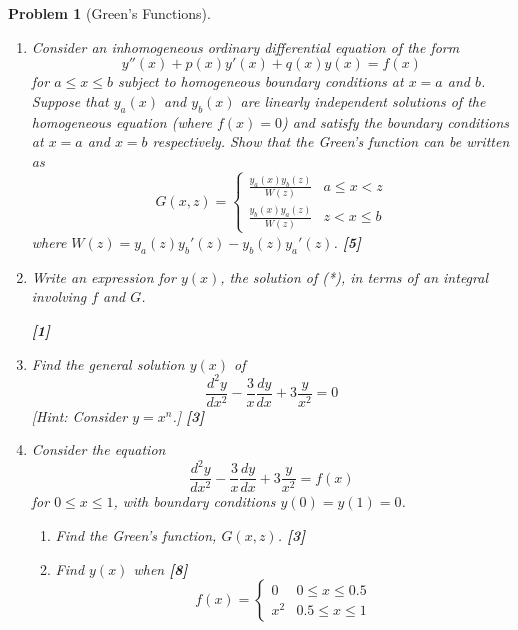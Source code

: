\documentclass[a4paper]{article}
\theoremstyle{new}
\newtheorem{qns}{Problem}[section]
\begin{document}
\begin{qns}[Green's Functions]\leavevmode
\begin{enumerate}[label=(\alph*)]
\item  Consider an inhomogeneous ordinary differential equation of the form
\begin{equation}
    y''(x)+p(x)y'(x)+q(x)y(x)=f(x)\tag{*}
\end{equation}
for $a\leq x\leq b$ subject to homogeneous boundary conditions at $x = a$ and $b$. Suppose that $y_a(x)$ and $y_b(x)$ are linearly independent solutions of the homogeneous equation (where $f(x) = 0$) and satisfy the boundary conditions at $x = a$ and $x = b$ respectively. Show that the Green’s function can be written as
$$G(x,z)=
\left\{
        \begin{array}{ll}
      \frac{y_a(x)y_b(z)}{W(z)} & a\leq x< z \\
      \frac{y_b(x)y_a(z)}{W(z)} & z< x\leq b 
        \end{array}
    \right.$$
where $W(z)=y_a(z)y_b'(z)-y_b(z)y_a'(z)$. \hfill\textbf{[5]}
\item Write an expression for $y(x)$, the solution of (*), in terms of an integral involving $f$ and $G$.

\hfill\textbf{[1]}
\item  Find the general solution $y(x)$ of
$$\frac{d^2y}{dx^2}-\frac{3}{x}\frac{dy}{dx}+3\frac{y}{x^2}=0$$
[Hint: Consider $y = x^n$.] \hfill\textbf{[3]}
\item Consider the equation
$$\frac{d^2y}{dx^2}-\frac{3}{x}\frac{dy}{dx}+3\frac{y}{x^2}=f(x)$$
for $0\leq x\leq 1$, with boundary conditions $y(0) = y(1) = 0$.
\begin{enumerate}[label=(\roman*)]
\item Find the Green’s function, $G(x, z)$. \hfill\textbf{[3]}
\item Find $y(x)$ when \hfill\textbf{[8]}
$$f(x)=
\left\{
        \begin{array}{ll}
      0 & 0\leq x\leq 0.5 \\
      x^2 & 0.5\leq x\le1 
        \end{array}
    \right.$$
    \end{enumerate}
\end{enumerate}
\end{qns}
\end{document}
